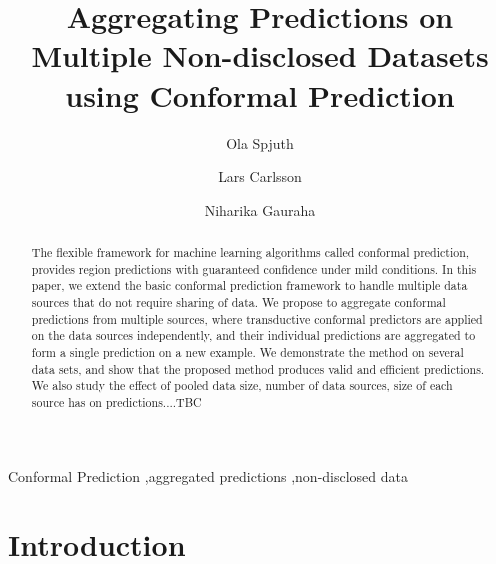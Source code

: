 \documentclass[main]{subfiles}
\begin{document}
\begin{frontmatter}

\title{Aggregating Predictions on Multiple Non-disclosed Datasets using Conformal Prediction}

\author[label1]{Ola Spjuth}
\author[label2]{Lars Carlsson}
\author[label1]{Niharika Gauraha}


\address[label1]{Uppsala University}
\address[label2]{AstraZeneca}

\begin{abstract}
The flexible framework for machine learning algorithms called conformal prediction, provides region predictions with guaranteed confidence under mild conditions. %
In this paper, we extend the basic conformal prediction framework to handle %
multiple data sources that do not require sharing of data.
We propose to aggregate conformal predictions from multiple sources, where transductive conformal predictors are applied on the data sources independently, and their individual predictions are aggregated to form a single prediction on a new example. We demonstrate the method on several data sets, and show that the proposed method produces valid and efficient predictions. We also study the effect of pooled data size, number of data sources, size of each source has on predictions....TBC
\end{abstract}
\begin{keyword}


Conformal Prediction \sep aggregated predictions \sep non-disclosed data
\end{keyword}

\end{frontmatter}

\section{Introduction}
\end{document}
